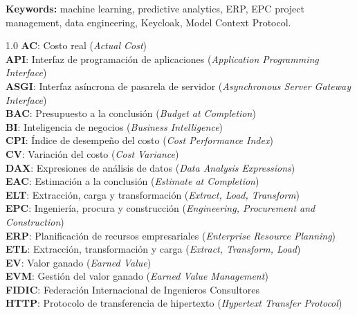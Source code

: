 \documentclass{univalle-perfil}
\begin{document}
\textbf{Keywords:} machine learning, predictive analytics, ERP, EPC project management, data engineering, Keycloak, Model Context Protocol.

\tableofcontents
\listoffigures
\listoftablas
\listoftables

\begin{spacing}{1.0}
\setlength{\parskip}{0pt}
\noindent
  \textbf{AC}: Costo real (\textit{Actual Cost})\\
  \textbf{API}: Interfaz de programación de aplicaciones (\textit{Application Programming Interface})\\
  \textbf{ASGI}: Interfaz asíncrona de pasarela de servidor (\textit{Asynchronous Server Gateway Interface})\\
  \textbf{BAC}: Presupuesto a la conclusión (\textit{Budget at Completion})\\
  \textbf{BI}: Inteligencia de negocios (\textit{Business Intelligence})\\
  \textbf{CPI}: Índice de desempeño del costo (\textit{Cost Performance Index})\\
  \textbf{CV}: Variación del costo (\textit{Cost Variance})\\
  \textbf{DAX}: Expresiones de análisis de datos (\textit{Data Analysis Expressions})\\
  \textbf{EAC}: Estimación a la conclusión (\textit{Estimate at Completion})\\
  \textbf{ELT}: Extracción, carga y transformación (\textit{Extract, Load, Transform})\\
  \textbf{EPC}: Ingeniería, procura y construcción (\textit{Engineering, Procurement and Construction})\\
  \textbf{ERP}: Planificación de recursos empresariales (\textit{Enterprise Resource Planning})\\
  \textbf{ETL}: Extracción, transformación y carga (\textit{Extract, Transform, Load})\\
  \textbf{EV}: Valor ganado (\textit{Earned Value})\\
  \textbf{EVM}: Gestión del valor ganado (\textit{Earned Value Management})\\
  \textbf{FIDIC}: Federación Internacional de Ingenieros Consultores\\
  \textbf{HTTP}: Protocolo de transferencia de hipertexto (\textit{Hypertext Transfer Protocol})\\

\end{spacing}
\end{document}
